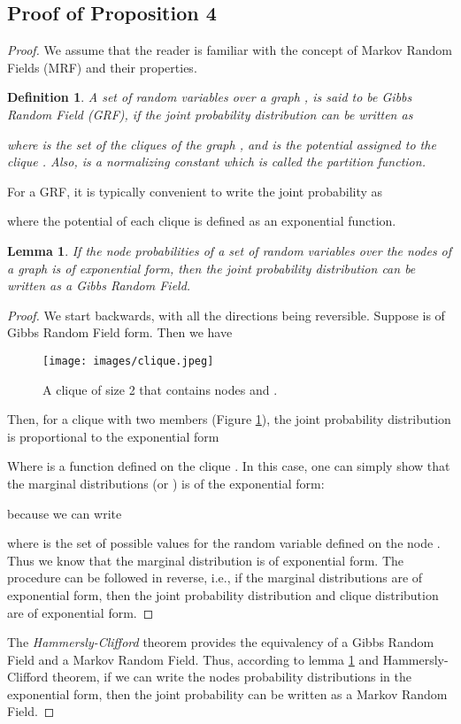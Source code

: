 \documentclass{article}
\newtheorem{lemma}{Lemma}
\newtheorem{definition}{Definition}
\begin{document}
\subsection{Proof of Proposition 4}
\begin{proof}
	We assume that the reader is familiar with the concept of Markov Random Fields (MRF) and their properties.
	\begin{definition}
		A set of random variables  over a graph , is said to be Gibbs Random Field (GRF), if the joint probability distribution can be written as
		 
		where  is the set of the cliques of the graph , and  is the potential assigned to the clique . Also,  is a normalizing constant which is called the partition function. 
	\end{definition}
	For a GRF, it is typically convenient to write the joint probability as 
	 	
	where the potential of each clique is defined as an exponential function.
	\begin{lemma}\label{lemma:prop4}
		If the node probabilities  of a set of random variables  over the nodes of a graph  is of exponential form, then the joint probability distribution can be written as a Gibbs Random Field.
	\end{lemma}
	\begin{proof}
		We start backwards, with all the directions being reversible. Suppose  is of Gibbs Random Field form. Then we have
		
		\begin{figure}[t]
			\begin{center}
				\texttt{[image: images/clique.jpeg]}
				\caption{A clique of size 2 that contains nodes  and .}
				\label{fig:clique}
			\end{center}
		\end{figure} 	
		Then, for a clique with two members (Figure \ref{fig:clique}), the joint probability distribution is proportional to the exponential form
		
		Where  is a function defined on the clique . In this case, one can simply show that the marginal distributions  (or ) is of the exponential form:
			
		because we can write
		
		where  is the set of possible values for the random variable defined on the node . Thus we know that the marginal distribution is of exponential form. The procedure can be followed in reverse, i.e., if the marginal distributions are of exponential form, then the joint probability distribution and clique distribution are of exponential form.
	\end{proof}
	The \textit{Hammersly-Clifford} theorem \cite{statsdict} provides the equivalency of a Gibbs Random Field and a Markov Random Field. Thus, according to lemma \ref{lemma:prop4} and Hammersly-Clifford theorem, if we can write the nodes probability distributions in the exponential form, then the joint probability can be written as a Markov Random Field. 
	

\end{proof}
\end{document}
